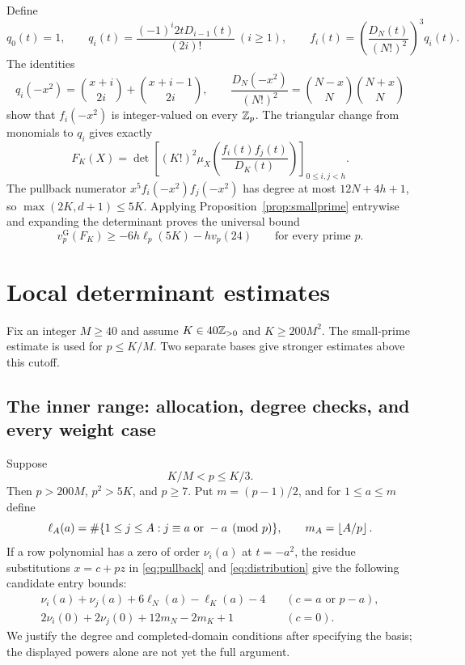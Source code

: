 Define
\[
 q_0(t)=1,\qquad q_i(t)=\frac{(-1)^i2tD_{i-1}(t)}{(2i)!}\ (i\ge1),
 \qquad f_i(t)=\left(\frac{D_N(t)}{(N!)^2}\right)^3q_i(t).
\]
The identities
\[
 q_i(-x^2)=\binom{x+i}{2i}+\binom{x+i-1}{2i},\qquad
 \frac{D_N(-x^2)}{(N!)^2}=\binom{N-x}{N}\binom{N+x}{N}
\]
show that $f_i(-x^2)$ is integer-valued on every $\mathbb Z_p$. The triangular
change from monomials to $q_i$ gives exactly
\begin{equation}\label{eq:Fbasis}
 F_K(X)=\det\left[(K!)^2\mu_X\left(\frac{f_i(t)f_j(t)}{D_K(t)}\right)
              \right]_{0\le i,j<h}.
\end{equation}
The pullback numerator $x^5f_i(-x^2)f_j(-x^2)$ has degree at most
$12N+4h+1$, so $\max(2K,d+1)\le5K$. Applying
Proposition~\ref{prop:smallprime} entrywise and expanding the determinant
proves the universal bound
\begin{equation}\label{eq:Fsmall}
 v_p^{\mathrm G}(F_K)\ge-6h\ell_p(5K)-h v_p(24)
 \qquad\text{for every prime }p.
\end{equation}

\section{Local determinant estimates}
\label{sec:detlocal}
Fix an integer $M\ge40$ and assume $K\in40\mathbb Z_{>0}$ and $K\ge200M^2$.
The small-prime estimate is used for $p\le K/M$. Two separate bases give
stronger estimates above this cutoff.

\subsection{The inner range: allocation, degree checks, and every weight case}
Suppose
\begin{equation}\label{eq:innerhyp}
 K/M<p\le K/3.
\end{equation}
Then $p>200M$, $p^2>5K$, and $p\ge7$. Put $m=(p-1)/2$, and for
$1\le a\le m$ define
\[
 \ell_A(a)=\#\{1\le j\le A:j\equiv a\text{ or }-a\pmod p\},
 \qquad m_A=\left\lfloor A/p\right\rfloor.
\]
If a row polynomial has a zero of order $\nu_i(a)$ at $t=-a^2$, the
residue substitutions $x=c+pz$ in \eqref{eq:pullback} and
\eqref{eq:distribution} give the following candidate entry bounds:
\begin{align}
 \nu_i(a)+\nu_j(a)+6\ell_N(a)-\ell_K(a)-4
 &\quad (c=a\text{ or }p-a),\label{eq:ordinarysource}\\
 2\nu_i(0)+2\nu_j(0)+12m_N-2m_K+1
 &\quad (c=0).\label{eq:zerosource}
\end{align}
We justify the degree and completed-domain conditions after specifying
the basis; the displayed powers alone are not yet the full argument.

